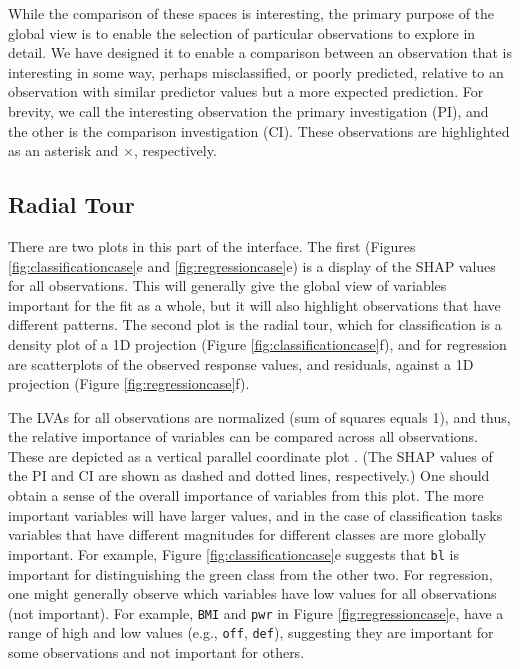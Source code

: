 \documentclass[
]{sn-jnl}
\begin{document}
While the comparison of these spaces is interesting, the primary purpose
of the global view is to enable the selection of particular observations
to explore in detail. We have designed it to enable a comparison between
an observation that is interesting in some way, perhaps misclassified,
or poorly predicted, relative to an observation with similar predictor
values but a more expected prediction. For brevity, we call the
interesting observation the primary investigation (PI), and the other is
the comparison investigation (CI). These observations are highlighted as
an asterisk and \(\times\), respectively.

\hypertarget{radial-tour}{%
\subsection{Radial Tour}\label{radial-tour}}

There are two plots in this part of the interface. The first (Figures
\ref{fig:classificationcase}e and \ref{fig:regressioncase}e) is a
display of the SHAP values for all observations. This will generally
give the global view of variables important for the fit as a whole, but
it will also highlight observations that have different patterns. The
second plot is the radial tour, which for classification is a density
plot of a 1D projection (Figure \ref{fig:classificationcase}f), and for
regression are scatterplots of the observed response values, and
residuals, against a 1D projection (Figure \ref{fig:regressioncase}f).

The LVAs for all observations are normalized (sum of squares equals 1),
and thus, the relative importance of variables can be compared across
all observations. These are depicted as a vertical parallel coordinate
plot \citep{ocagne_coordonnees_1885}. (The SHAP values of the PI and CI
are shown as dashed and dotted lines, respectively.) One should obtain a
sense of the overall importance of variables from this plot. The more
important variables will have larger values, and in the case of
classification tasks variables that have different magnitudes for
different classes are more globally important. For example, Figure
\ref{fig:classificationcase}e suggests that \texttt{bl} is important for
distinguishing the green class from the other two. For regression, one
might generally observe which variables have low values for all
observations (not important). For example, \texttt{BMI} and \texttt{pwr}
in Figure \ref{fig:regressioncase}e, have a range of high and low values
(e.g., \texttt{off}, \texttt{def}), suggesting they are important for
some observations and not important for others.
\end{document}
